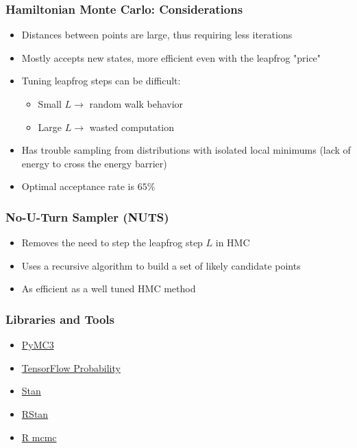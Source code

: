 \documentclass{beamer}
\begin{document}
\begin{frame}
  \frametitle{Hamiltonian Monte Carlo: Considerations}
  \begin{itemize}
    \item Distances between points are large, thus requiring less iterations
    \item Mostly accepts new states, more efficient even with the leapfrog "price"
    \item Tuning leapfrog steps can be difficult:
    \begin{itemize}
      \item Small $L \rightarrow$ random walk behavior
      \item Large $L \rightarrow$ wasted computation
    \end{itemize}
    \item Has trouble sampling from distributions with isolated local minimums (lack of energy to cross the energy barrier)
    \item Optimal acceptance rate is $65\%$
  \end{itemize}
\end{frame}

\begin{frame}
  \frametitle{No-U-Turn Sampler (NUTS)}
  \begin{itemize}
    \item Removes the need to step the leapfrog step $L$ in HMC
    \item Uses a recursive algorithm to build a set of likely candidate points
    \item As efficient as a well tuned HMC method
  \end{itemize}
\end{frame}





\begin{frame}
  \frametitle{Libraries and Tools}
  \begin{itemize}
    \item \href{https://pymc-devs.github.io/pymc3/}{PyMC3}
    \item \href{https://www.tensorflow.org/probability/}{TensorFlow Probability}
    \item \href{http://mc-stan.org}{Stan}
    \item \href{https://mc-stan.org/users/interfaces/rstan}{RStan}
    \item \href{https://cran.r-project.org/web/packages/mcmc/index.html}{R mcmc}
  \end{itemize}
\end{frame}
\end{document}
